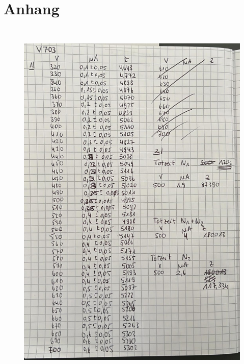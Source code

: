\section{Anhang}

\begin{figure}[H]
    \centering
    \includegraphics[height=180mm]{bilder/Anh1.jpeg}
\end{figure}